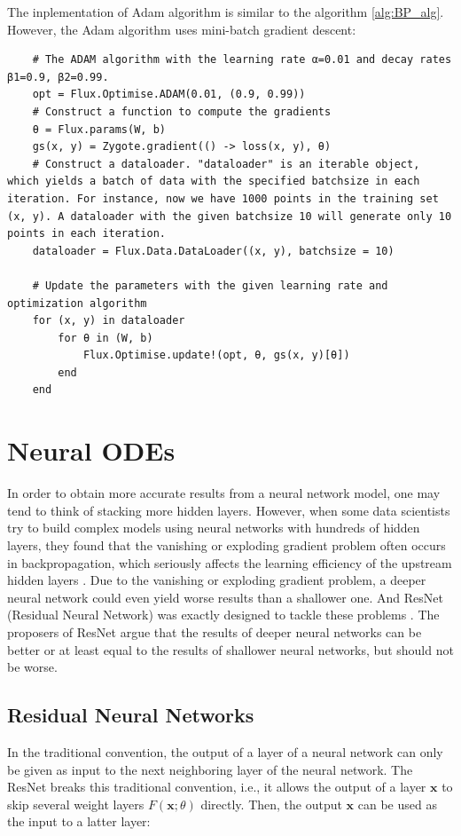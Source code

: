 \documentclass[
	parskip, 			   %
	twoside, 			   %
	DIV=14, 			   %
	BCOR=15.0mm, 		   %
	headsepline, 		   %
	open=right, 		   %
	captions=tableheading, %
	bibliography=totoc,    %
	numbers=noenddot       %
]{scrreprt}
\begin{document}
The inplementation of Adam algorithm is similar to the algorithm \ref{alg:BP_alg}. However, the Adam algorithm uses mini-batch gradient descent:

\begin{verbatim}
    # The ADAM algorithm with the learning rate α=0.01 and decay rates β1=0.9, β2=0.99.
    opt = Flux.Optimise.ADAM(0.01, (0.9, 0.99))
    # Construct a function to compute the gradients
    θ = Flux.params(W, b)
    gs(x, y) = Zygote.gradient(() -> loss(x, y), θ)
    # Construct a dataloader. "dataloader" is an iterable object, which yields a batch of data with the specified batchsize in each iteration. For instance, now we have 1000 points in the training set (x, y). A dataloader with the given batchsize 10 will generate only 10 points in each iteration.
    dataloader = Flux.Data.DataLoader((x, y), batchsize = 10)

    # Update the parameters with the given learning rate and optimization algorithm
    for (x, y) in dataloader
        for θ in (W, b) 
            Flux.Optimise.update!(opt, θ, gs(x, y)[θ])
        end
    end
\end{verbatim}

\clearpage
\chapter{Neural ODEs}
\label{ch:chapter5}
In order to obtain more accurate results from a neural network model, one may tend to think of stacking more hidden layers. However, when some data scientists try to build complex models using neural networks with hundreds of hidden layers, they found that the vanishing or exploding gradient problem often occurs in backpropagation, which seriously affects the learning efficiency of the upstream hidden layers \cite{glorot2010understanding}. Due to the vanishing or exploding gradient problem, a deeper neural network could even yield worse results than a shallower one. And ResNet (Residual Neural Network) was exactly designed to tackle these problems \cite{he2016deep}. The proposers of ResNet argue that the results of deeper neural networks can be better or at least equal to the results of shallower neural networks, but should not be worse.

\section{Residual Neural Networks}
In the traditional convention, the output of a layer of a neural network can only be given as input to the next neighboring layer of the neural network. The ResNet breaks this traditional convention, i.e., it allows the output of a layer $\mathbf{x}$ to skip several weight layers $F(\mathbf{x};\theta)$ directly. Then, the output $\mathbf{x}$ can be used as the input to a latter layer:
\end{document}

